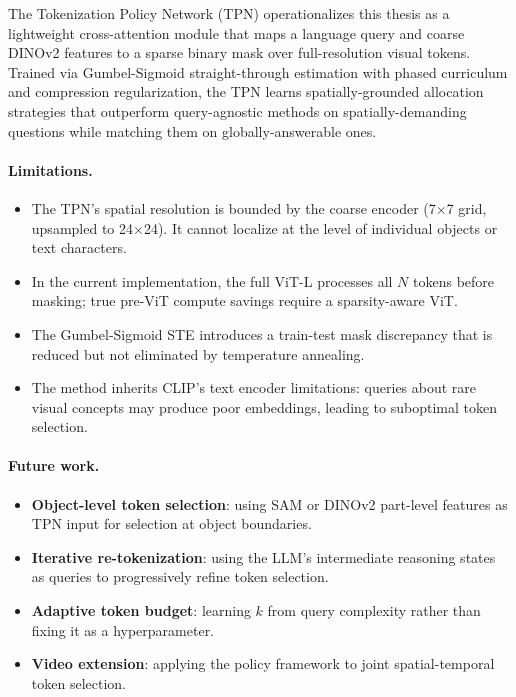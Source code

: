 \documentclass[12pt,a4paper]{article}
\begin{document}
The Tokenization Policy Network (TPN) operationalizes this thesis as a lightweight
cross-attention module that maps a language query and coarse DINOv2 features to a
sparse binary mask over full-resolution visual tokens. Trained via Gumbel-Sigmoid
straight-through estimation with phased curriculum and compression regularization,
the TPN learns spatially-grounded allocation strategies that outperform
query-agnostic methods on spatially-demanding questions while matching them on
globally-answerable ones.

\paragraph{Limitations.}
\begin{itemize}[leftmargin=2em]
  \item The TPN's spatial resolution is bounded by the coarse encoder (7$\times$7
    grid, upsampled to 24$\times$24). It cannot localize at the level of
    individual objects or text characters.
  \item In the current implementation, the full ViT-L processes all $N$ tokens
    before masking; true pre-ViT compute savings require a sparsity-aware ViT.
  \item The Gumbel-Sigmoid STE introduces a train-test mask discrepancy that
    is reduced but not eliminated by temperature annealing.
  \item The method inherits CLIP's text encoder limitations: queries about rare
    visual concepts may produce poor embeddings, leading to suboptimal token
    selection.
\end{itemize}

\paragraph{Future work.}
\begin{itemize}[leftmargin=2em]
  \item \textbf{Object-level token selection}: using SAM or DINOv2 part-level
    features as TPN input for selection at object boundaries.
  \item \textbf{Iterative re-tokenization}: using the LLM's intermediate
    reasoning states as queries to progressively refine token selection.
  \item \textbf{Adaptive token budget}: learning $k$ from query complexity
    rather than fixing it as a hyperparameter.
  \item \textbf{Video extension}: applying the policy framework to joint
    spatial-temporal token selection.
\end{itemize}
\end{document}
